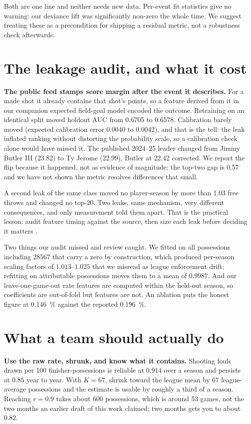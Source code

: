 \documentclass[10pt,letterpaper]{article}
\begin{document}
Both are one line and neither needs new data. Per-event fit statistics give no
warning: our deviance lift was significantly non-zero the whole time. We suggest
treating these as a precondition for shipping a residual metric, not a robustness
check afterwards.

\section{The leakage audit, and what it cost}

\textbf{The public feed stamps score margin after the event it describes.} For a
made shot it already contains that shot's points, so a feature derived from it in
our companion expected field-goal model encoded the outcome. Retraining on an
identical split moved holdout AUC from 0.6705 to 0.6578. Calibration barely moved
(expected calibration error 0.0040 to 0.0042), and that is the tell: the leak
inflated ranking without distorting the probability scale, so a calibration check
alone would have missed it. The published 2024--25 leader changed from Jimmy
Butler III (23.82) to Ty Jerome (22.99), Butler at 22.42 corrected. We report the
flip because it happened, not as evidence of magnitude: the top-two gap is 0.57
and we have not shown the metric resolves differences that small.

A second leak of the same class moved no player-season by more than 1.03 free
throws and changed no top-20. Two leaks, same mechanism, very different
consequences, and only measurement told them apart. That is the practical lesson:
audit feature timing against the source, then size each leak before deciding it
matters \citep{kaufman2012leakage}.

Two things our audit missed and review caught. We fitted on all possessions
including \num{28567} that carry a zero by construction, which produced
per-season scaling factors of $1.013$--$1.025$ that we misread as league
enforcement drift; refitting on attributable possessions moves them to a mean of $0.9987$. And our leave-one-game-out rate features are computed within the
held-out season, so coefficients are out-of-fold but features are not. An
ablation puts the honest figure at \SI{0.146}{\percent} against the reported
\SI{0.196}{\percent}.

\section{What a team should actually do}

\textbf{Use the raw rate, shrunk, and know what it contains.} Shooting fouls
drawn per 100 finisher-possessions is reliable at $0.914$ over a season and
persists at $0.85$ year to year. With $K = 67$, shrink toward the league mean by
67 league-average possessions and the estimate is usable by roughly a third of a
season. Reaching $r = 0.9$ takes about 600 possessions, which is around 53 games,
not the two months an earlier draft of this work claimed; two months gets you to
about $0.82$.
\end{document}
